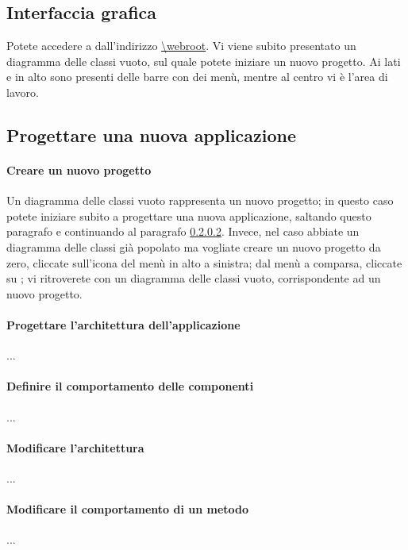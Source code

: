 \subsection{Interfaccia grafica} \label{sec:gui}

Potete accedere a \proj{} dall'indirizzo \url{\webroot}. Vi viene subito presentato un diagramma delle classi vuoto, sul quale potete iniziare un nuovo progetto. Ai lati e in alto sono presenti delle barre con dei menù, mentre al centro vi è l'area di lavoro.



\subsection{Progettare una nuova applicazione} \label{sec:new}

\paragraph{Creare un nuovo progetto}
Un diagramma delle classi vuoto rappresenta un nuovo progetto; in questo caso potete iniziare subito a progettare una nuova applicazione, saltando questo paragrafo e continuando al paragrafo \ref{par:arch}. Invece, nel caso abbiate un diagramma delle classi già popolato ma vogliate creare un nuovo progetto da zero, cliccate sull'icona del menù in alto a sinistra; dal menù a comparsa, cliccate su ; vi ritroverete con un diagramma delle classi vuoto, corrispondente ad un nuovo progetto.

\paragraph{Progettare l'architettura dell'applicazione} \label{par:arch}
...

\paragraph{Definire il comportamento delle componenti}
...

\paragraph{Modificare l'architettura}
...

\paragraph{Modificare il comportamento di un metodo}
...




